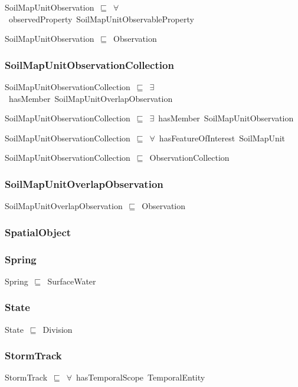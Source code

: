 \documentclass{article}
\begin{document}
SoilMapUnitObservation~\ensuremath{\sqsubseteq}~\ensuremath{\forall}~observedProperty~SoilMapUnitObservableProperty~

SoilMapUnitObservation~\ensuremath{\sqsubseteq}~Observation~

\subsubsection*{SoilMapUnitObservationCollection}

SoilMapUnitObservationCollection~\ensuremath{\sqsubseteq}~\ensuremath{\exists}~hasMember~SoilMapUnitOverlapObservation~

SoilMapUnitObservationCollection~\ensuremath{\sqsubseteq}~\ensuremath{\exists}~hasMember~SoilMapUnitObservation~

SoilMapUnitObservationCollection~\ensuremath{\sqsubseteq}~\ensuremath{\forall}~hasFeatureOfInterest~SoilMapUnit~

SoilMapUnitObservationCollection~\ensuremath{\sqsubseteq}~ObservationCollection~

\subsubsection*{SoilMapUnitOverlapObservation}

SoilMapUnitOverlapObservation~\ensuremath{\sqsubseteq}~Observation~

\subsubsection*{SpatialObject}

\subsubsection*{Spring}

Spring~\ensuremath{\sqsubseteq}~SurfaceWater~

\subsubsection*{State}

State~\ensuremath{\sqsubseteq}~Division~

\subsubsection*{StormTrack}

StormTrack~\ensuremath{\sqsubseteq}~\ensuremath{\forall}~hasTemporalScope~TemporalEntity~
\end{document}
